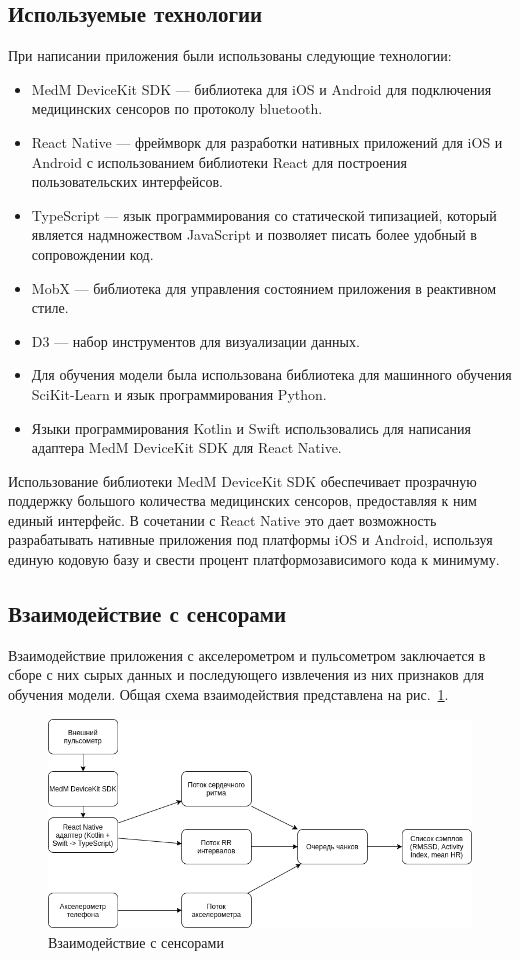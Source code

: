\documentclass[14pt]{matmex-diploma-custom}
\begin{document}
\subsection{Используемые технологии}
При написании приложения были использованы следующие технологии:
\begin{itemize}
\item MedM DeviceKit SDK --- библиотека для iOS и Android для подключения
  медицинских сенсоров по протоколу bluetooth.
\item React Native --- фреймворк для разработки нативных приложений для iOS и
  Android с использованием библиотеки React для построения пользовательских
  интерфейсов.
\item TypeScript --- язык программирования со статической типизацией, который
  является надмножеством JavaScript и позволяет писать более удобный в
  сопровождении код.
\item MobX --- библиотека для управления состоянием приложения в реактивном
  стиле.
\item D3 --- набор инструментов для визуализации данных.
\item Для обучения модели была использована библиотека для машинного обучения
  SciKit-Learn и язык программирования Python.
\item Языки программирования Kotlin и Swift использовались для написания
  адаптера MedM DeviceKit SDK для React Native.
\end{itemize}

Использование библиотеки MedM DeviceKit SDK обеспечивает прозрачную поддержку
большого количества медицинских сенсоров, предоставляя к ним единый интерфейс. В
сочетании с React Native это дает возможность разрабатывать нативные приложения
под платформы iOS и Android, используя единую кодовую базу и свести процент
платформозависимого кода к минимуму.

\subsection{Взаимодействие с сенсорами}
Взаимодействие приложения с акселерометром и пульсометром заключается в сборе с
них сырых данных и последующего извлечения из них признаков для обучения модели.
Общая схема взаимодействия представлена на рис.~\ref{fig:sensors_interaction}.

\begin{figure}[ht]
  \centering \includegraphics[width=\textwidth]{images/sensors_interaction.png}
  \caption{Взаимодействие с сенсорами}
  \label{fig:sensors_interaction}
\end{figure}
\end{document}
